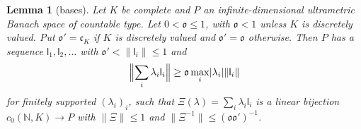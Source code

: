 \documentclass[11pt]{amsart}
\newtheorem{lemma}[theorem]{Lemma}
\theoremstyle{definition}
\theoremstyle{remark}
\numberwithin{equation}{section}
\newcommand{\N}{\mathbb N}
\newcommand{\abs}[1]{\lvert #1\rvert}
\newcommand{\norm}[1]{\lVert #1\rVert}
\theoremstyle{plain}
\theoremstyle{definition}
\theoremstyle{plain}
\begin{document}
\begin{lemma}[bases]\label{dp:lem:basis}
Let $K$ be complete and $P$ an infinite-dimensional ultrametric Banach space of countable type. Let $0<\mathfrak o\le1$, with $\mathfrak o<1$ unless $K$ is discretely valued. Put $\mathfrak o'=\mathfrak c_K$ if $K$ is discretely valued and $\mathfrak o'=\mathfrak o$ otherwise. Then $P$ has a sequence $\mathsf l_1,\mathsf l_2,\dots$ with $\mathfrak o'<\norm{\mathsf l_i}\le1$ and
\begin{equation}\label{dp:agr:eq:orthogonal}
 \Bigl\lVert\sum_i\lambda_i\mathsf l_i\Bigr\rVert\ge\mathfrak o\max_i\abs{\lambda_i}\norm{\mathsf l_i}
\end{equation}
for finitely supported $(\lambda_i)_i$, such that $\Xi(\lambda)=\sum_i\lambda_i\mathsf l_i$ is a linear bijection $c_0(\N,K)\to P$ with $\norm\Xi\le1$ and $\norm{\Xi^{-1}}\le(\mathfrak o\mathfrak o')^{-1}$.
\end{lemma}
\end{document}
